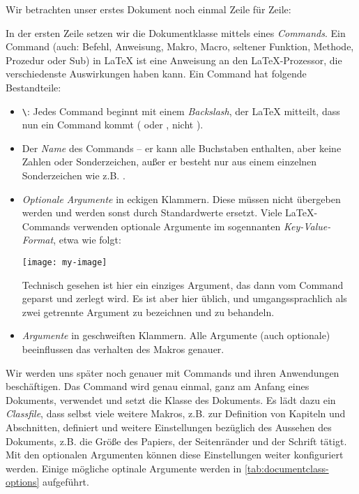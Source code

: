 Wir betrachten unser erstes Dokument noch einmal Zeile für Zeile:
In der ersten Zeile setzen wir die Dokumentklasse mittels eines \emph{Commands}.
Ein Command (auch: Befehl, Anweisung, Makro, Macro, seltener Funktion, Methode, Prozedur oder Sub) in \LaTeX{} ist eine Anweisung an den \LaTeX{}-Prozessor, die verschiedenste Auswirkungen haben kann.
Ein Command hat folgende Bestandteile:
\begin{itemize}
	\item \texttt{\textbackslash}: Jedes Command beginnt mit einem \emph{Backslash}, der \LaTeX{} mitteilt, dass nun ein Command kommt ( oder , nicht ).
	\item Der \emph{Name} des Commands -- er kann alle Buchstaben enthalten, aber keine Zahlen oder Sonderzeichen, außer er besteht nur aus einem einzelnen Sonderzeichen wie z.B. \latexcommand{\%}.
	\item \emph{Optionale Argumente} in eckigen Klammern.
	Diese müssen nicht übergeben werden und werden sonst durch Standardwerte ersetzt.
	Viele \LaTeX{}-Commands verwenden optionale Argumente im sogennanten \emph{Key-Value-Format}, etwa wie folgt:
	\begin{latexlisting}
		\texttt{[image: my-image]}
	\end{latexlisting}
	Technisch gesehen ist hier  ein einziges Argument, das dann vom Command geparst und zerlegt wird.
	Es ist aber hier üblich,  und  umgangssprachlich als zwei getrennte Argument zu bezeichnen und zu behandeln.
	\item \emph{Argumente} in geschweiften Klammern.
	Alle Argumente (auch optionale) beeinflussen das verhalten des Makros genauer.
\end{itemize}
Wir werden uns später noch genauer mit Commands und ihren Anwendungen beschäftigen.
Das Command  wird genau einmal, ganz am Anfang eines Dokuments, verwendet und setzt die Klasse des Dokuments.
Es lädt dazu ein \emph{Classfile}, dass selbst viele weitere Makros, z.B. zur Definition von Kapiteln und Abschnitten, definiert und weitere Einstellungen bezüglich des Aussehen des Dokuments, z.B. die Größe des Papiers, der Seitenränder und der Schrift tätigt.
Mit den optionalen Argumenten können diese Einstellungen weiter konfiguriert werden.
Einige mögliche optinale Argumente werden in \autoref{tab:documentclass-options} aufgeführt.

